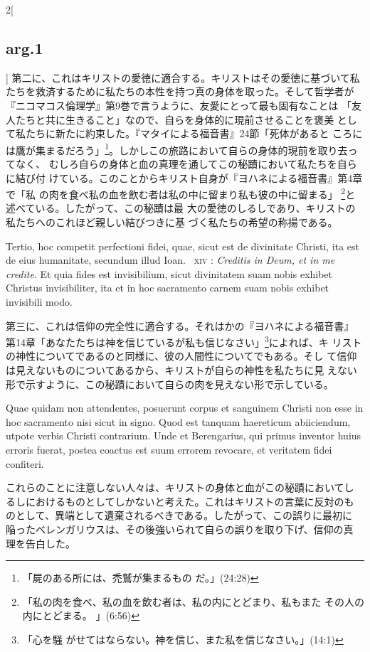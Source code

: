 \documentclass[paper=a4paper,fontsize=10pt,jafontsize=9pt,titlepage]{jlreq}
\begin{document}
\begin{paracol}{2}[\subsection{arg.1}]
第二に、これはキリストの愛徳に適合する。キリストはその愛徳に基づいて私
たちを救済するために私たちの本性を持つ真の身体を取った。そして哲学者が
『ニコマコス倫理学』第9巻で言うように、友愛にとって最も固有なことは
「友人たちと共に生きること」なので、自らを身体的に現前させることを褒美
として私たちに新たに約束した。『マタイによる福音書』24節「死体があると
ころには鷹が集まるだろう」\footnote{「屍のある所には、禿鷲が集まるもの
だ。」(24:28)}。しかしこの旅路において自らの身体的現前を取り去ってなく、
むしろ自らの身体と血の真理を通してこの秘蹟において私たちを自らに結び付
けている。このことからキリスト自身が『ヨハネによる福音書』第4章で「私
の肉を食べ私の血を飲む者は私の中に留まり私も彼の中に留まる」
\footnote{「私の肉を食べ、私の血を飲む者は、私の内にとどまり、私もまた
その人の内にとどまる。 」(6:56)}と述べている。したがって、この秘蹟は最
大の愛徳のしるしであり、キリストの私たちへのこれほど親しい結びつきに基
づく私たちの希望の称揚である。

\switchcolumn*

Tertio, hoc competit perfectioni fidei, quae, sicut est de divinitate
Christi, ita est de eius humanitate, secundum illud Ioan.~{\scshape
xiv} : {\itshape Creditis in Deum, et in me credite}. Et quia fides
est invisibilium, sicut divinitatem suam nobis exhibet Christus
invisibiliter, ita et in hoc sacramento carnem suam nobis exhibet
invisibili modo.

\switchcolumn

第三に、これは信仰の完全性に適合する。それはかの『ヨハネによる福音書』
第14章「あなたたちは神を信じているが私も信じなさい」\footnote{「心を騒
がせてはならない。神を信じ、また私を信じなさい。」(14:1)}によれば、キ
リストの神性についてであるのと同様に、彼の人間性についてでもある。そし
て信仰は見えないものについてあるから、キリストが自らの神性を私たちに見
えない形で示すように、この秘蹟において自らの肉を見えない形で示している。

\switchcolumn*

Quae quidam non attendentes, posuerunt corpus et sanguinem Christi non
esse in hoc sacramento nisi sicut in signo. Quod est tanquam
haereticum abiiciendum, utpote verbis Christi contrarium. Unde et
Berengarius, qui primus inventor huius erroris fuerat, postea coactus
est suum errorem revocare, et veritatem fidei confiteri.

\switchcolumn

これらのことに注意しない人々は、キリストの身体と血がこの秘蹟においてし
るしにおけるものとしてしかないと考えた。これはキリストの言葉に反対のも
のとして、異端として遺棄されるべきである。したがって、この誤りに最初に
陥ったベレンガリウスは、その後強いられて自らの誤りを取り下げ、信仰の真
理を告白した。


\end{paracol}
\end{document}
